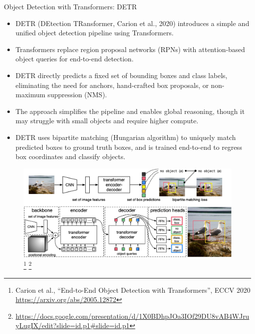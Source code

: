 \begin{frame}[allowframebreaks]{Object Detection with Transformers: DETR}
    \begin{itemize}
        \item DETR (DEtection TRansformer, Carion et al., 2020) introduces a simple and unified object detection pipeline using Transformers.
        \item Transformers replace region proposal networks (RPNs) with attention-based object queries for end-to-end detection.
        \item DETR directly predicts a fixed set of bounding boxes and class labels, eliminating the need for anchors, hand-crafted box proposals, or non-maximum suppression (NMS).
        \item The approach simplifies the pipeline and enables global reasoning, though it may struggle with small objects and require higher compute.
        \item DETR uses bipartite matching (Hungarian algorithm) to uniquely match predicted boxes to ground truth boxes, and is trained end-to-end to regress box coordinates and classify objects.
    \end{itemize}

    \framebreak

    \begin{figure}
        \centering
        \includegraphics[width=\linewidth,height=0.9\textheight,keepaspectratio]{images/vit/slide_73_1_img.jpg}
        \footnote{Carion et al., “End-to-End Object Detection with Transformers”, ECCV 2020 \url{https://arxiv.org/abs/2005.12872}}
        \footnote{\url{https://docs.google.com/presentation/d/1X0BDhpJOa3IOf29DU8vAB4WJruyLugIX/edit?slide=id.p1#slide=id.p1}}
    \end{figure}
\end{frame}